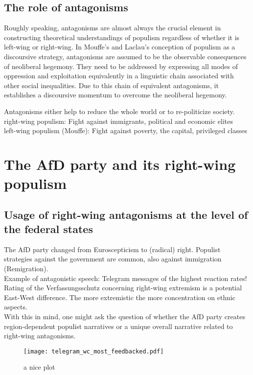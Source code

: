 \documentclass[a4paper]{scrreprt}
\begin{document}
\section{The role of antagonisms}
Roughly speaking, antagonisms are almost always the crucial element in constructing theoretical understandings of populism regardless of whether it is left-wing or right-wing. In Mouffe's and Laclau's conception of populism as a discoursive strategy, antagonisms are assumed to be the observable consequences of neoliberal hegemony. They need to be addressed by expressing all modes of oppression and exploitation equivalently in a linguistic chain associated with other social inequalities. Due to this chain of equivalent antagonisms, it establishes a discoursive momentum to overcome the neoliberal hegemony. \cite[p.~135]{laclaumouffe:2001}\par
Antagonisms either help to reduce the whole world or to re-politicize society.\\
right-wing populism: Fight against immigrants, political and economic elites\\
left-wing populism (Mouffe): Fight against poverty, the capital, privileged classes
\chapter{The AfD party and its right-wing populism}
\section{Usage of right-wing antagonisms at the level of the federal states}
The AfD party changed from Euroscepticism to (radical) right. Populist strategies against the government are common, also against immigration (Remigration).\\
Example of antagonistic speech: Telegram messages of the highest reaction rates!\\
Rating of the Verfassungsschutz concerning right-wing extremism is a potential East-West difference. The more extremistic the more concentration on ethnic aspects.\\
With this in mind, one might ask the question of whether the AfD party creates region-dependent populist narratives or a unique overall narrative related to right-wing antagonisms.
\begin{figure}
    \centering
    \texttt{[image: telegram\_wc\_most\_feedbacked.pdf]}
    \caption{a nice plot}
\end{figure}
\end{document}
